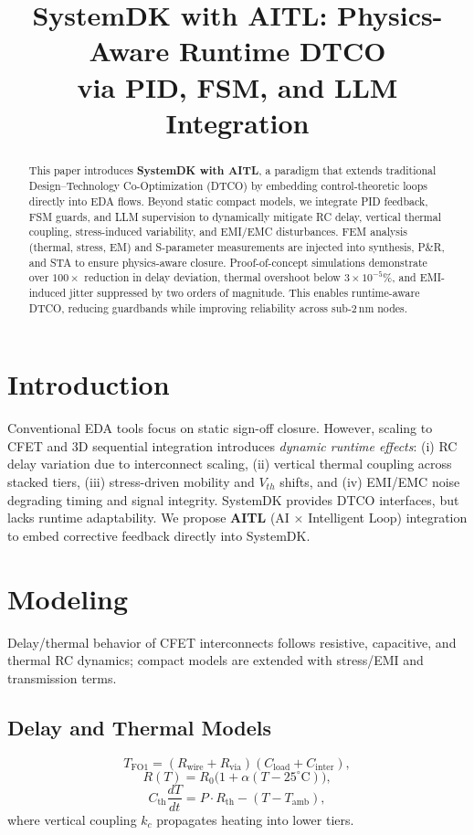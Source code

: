 \documentclass[conference]{IEEEtran}
\title{SystemDK with AITL: Physics-Aware Runtime DTCO\\ via PID, FSM, and LLM Integration}
\author{
  \IEEEauthorblockN{Shinichi Samizo}
  \IEEEauthorblockA{Independent Semiconductor Researcher\\
  Email: \href{mailto:shin3t72@gmail.com}{shin3t72@gmail.com}}
}
\begin{document}
\maketitle

\begin{abstract}
This paper introduces \textbf{SystemDK with AITL}, a paradigm that extends traditional Design--Technology Co-Optimization (DTCO) by embedding control-theoretic loops directly into EDA flows. Beyond static compact models, we integrate PID feedback, FSM guards, and LLM supervision to dynamically mitigate RC delay, vertical thermal coupling, stress-induced variability, and EMI/EMC disturbances. FEM analysis (thermal, stress, EM) and S-parameter measurements are injected into synthesis, P\&R, and STA to ensure physics-aware closure. Proof-of-concept simulations demonstrate over $100\times$ reduction in delay deviation, thermal overshoot below $3\times10^{-5}\%$, and EMI-induced jitter suppressed by two orders of magnitude. This enables runtime-aware DTCO, reducing guardbands while improving reliability across sub-2\,nm nodes.
\end{abstract}

\section{Introduction}
Conventional EDA tools focus on static sign-off closure. However, scaling to CFET and 3D sequential integration introduces \emph{dynamic runtime effects}: (i) RC delay variation due to interconnect scaling, (ii) vertical thermal coupling across stacked tiers, (iii) stress-driven mobility and $V_{th}$ shifts, and (iv) EMI/EMC noise degrading timing and signal integrity. SystemDK provides DTCO interfaces, but lacks runtime adaptability. We propose \textbf{AITL} (AI $\times$ Intelligent Loop) integration to embed corrective feedback directly into SystemDK.

\section{Modeling}
Delay/thermal behavior of CFET interconnects follows resistive, capacitive, and thermal RC dynamics; compact models are extended with stress/EMI and transmission terms.

\subsection{Delay and Thermal Models}
\begin{equation}
T_{\mathrm{FO1}}=(R_{\mathrm{wire}}+R_{\mathrm{via}})(C_{\mathrm{load}}+C_{\mathrm{inter}}),
\end{equation}
\vspace{-6pt}
\begin{equation}
R(T)=R_0\bigl(1+\alpha(T-25^{\circ}\mathrm{C})\bigr),
\end{equation}
\vspace{-6pt}
\begin{equation}
C_{\mathrm{th}}\frac{dT}{dt}=P\cdot R_{\mathrm{th}}-(T-T_{\mathrm{amb}}),
\end{equation}
where vertical coupling $k_c$ propagates heating into lower tiers.
\end{document}
